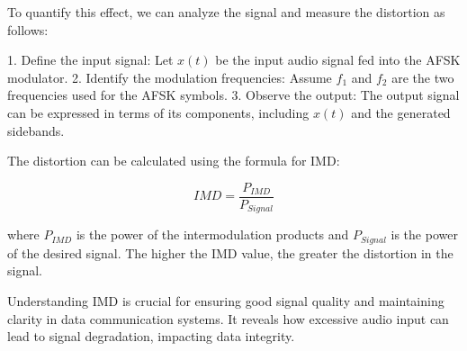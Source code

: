 To quantify this effect, we can analyze the signal and measure the distortion as follows:

1. Define the input signal: Let \( x(t) \) be the input audio signal fed into the AFSK modulator.
2. Identify the modulation frequencies: Assume \( f_1 \) and \( f_2 \) are the two frequencies used for the AFSK symbols.
3. Observe the output: The output signal can be expressed in terms of its components, including \( x(t) \) and the generated sidebands.

The distortion can be calculated using the formula for IMD:

\[
IMD = \frac{P_{IMD}}{P_{Signal}}
\]

where \( P_{IMD} \) is the power of the intermodulation products and \( P_{Signal} \) is the power of the desired signal. The higher the IMD value, the greater the distortion in the signal.

Understanding IMD is crucial for ensuring good signal quality and maintaining clarity in data communication systems. It reveals how excessive audio input can lead to signal degradation, impacting data integrity.

